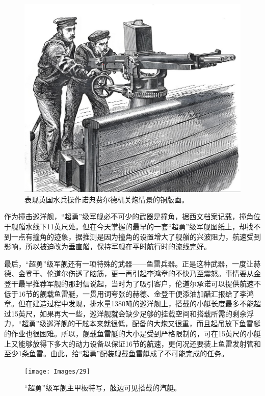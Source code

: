 \documentclass[12pt,UTF8]{ctexbook}
\begin{document}
\begin{figure}[htbp]
	\centering
	\includegraphics[width=1\linewidth]{Images/28}
	\caption{表现英国水兵操作诺典费尔德机关炮情景的铜版画。}
	\label{fig:1}
\end{figure}

作为撞击巡洋舰，“超勇”级军舰必不可少的武器是撞角，据西文档案记载，撞角位于舰艏水线下11英尺处。但在今天掌握的最早的一套“超勇”级军舰图纸上，却找不到一点有撞角的迹象，据推测是因为撞角的设置增大了舰艏的兴波阻力，航速受到影响，所以被迫改为垂直艏，保持军舰在平时航行时的流线完好。

最后，“超勇”级军舰还有一项特殊的武器——鱼雷兵器。正是这种武器，一度让赫德、金登干、伦道尔伤透了脑筋，更一再引起李鸿章的不快乃至震怒。事情要从金登干最早推荐军舰的那封信说起，当时为了吸引客户，伦道尔承诺可以提供航速不低于16节的舰载鱼雷艇，一贯用词夸张的赫德、金登干便添油加醋汇报给了李鸿章。但在建造过程中发现，排水量1380吨的巡洋舰上，搭载的小艇长度最多不能超过15英尺，如果再大一些，巡洋舰就会缺少足够的挂载空间和搭载所需的剩余浮力，“超勇”级巡洋舰的干舷本来就很低，配备的大炮又很重，而且起吊放下鱼雷艇的作业也很困难。所以，舰载鱼雷艇的大小是受到严格限制的，可在15英尺的小艇上又能够放得下多大的动力设备以保证16节的航速，更何况还要装上鱼雷发射管和至少1条鱼雷。由此，给“超勇”配装舰载鱼雷艇成了不可能完成的任务。

\begin{figure}[htbp]
	\centering
	\texttt{[image: Images/29]}
	\caption{“超勇”级军舰主甲板特写，舷边可见搭载的汽艇。}
	\label{fig:1}
\end{figure}
\end{document}
